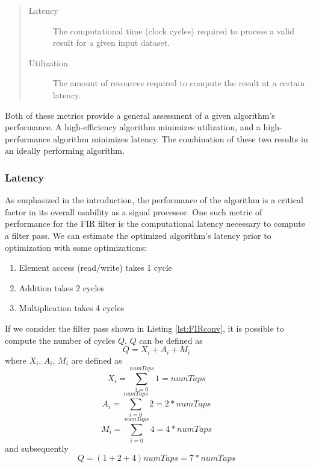 \documentclass[../report_polarFIR.tex]{subfiles}
\begin{document}
\begin{quote}
\begin{description}
	\item [Latency] The computational time (clock cycles) required to process a valid result for a given input dataset.
	\item [Utilization] The amount of resources required to compute the result at a certain latency.
\end{description}
\end{quote}

Both of these metrics provide a general assessment of a given algorithm's performance. A high-efficiency algorithm minimizes utilization, and a high-performance algorithm minimizes latency. The combination of these two results in an ideally performing algorithm.

\subsubsection{Latency}
As emphasized in the introduction, the performance of the algorithm is a critical factor in its overall usability as a signal processor. One such metric of performance for the FIR filter is the computational latency necessary to compute a filter pass. We can estimate the optimized algorithm's latency prior to optimization with some optimizations:
\begin{enumerate}
	\item Element access (read/write) takes 1 cycle
	\item Addition takes 2 cycles
	\item Multiplication takes 4 cycles
\end{enumerate}
If we consider the filter pass shown in Listing \ref{lst:FIRconv}, it is possible to compute the number of cycles $Q$. $Q$ can be defined as 
\begin{equation}
	Q = X_i + A_i + M_i
\end{equation}
where $X_i$, $A_i$, $M_i$ are defined as 
\begin{equation}
	X_i = \sum_{i=0}^{numTaps} 1 = numTaps
\end{equation}
\begin{equation}
	A_i = \sum_{i=0}^{numTaps} 2 = 2 * numTaps
\end{equation}
\begin{equation}
	M_i = \sum_{i=0}^{numTaps} 4 = 4 * numTaps
\end{equation}
and subsequently 
\begin{equation}\label{FIRlatency}
	Q = (1 + 2 + 4)numTaps = 7 * numTaps
\end{equation}
 
\end{document}

